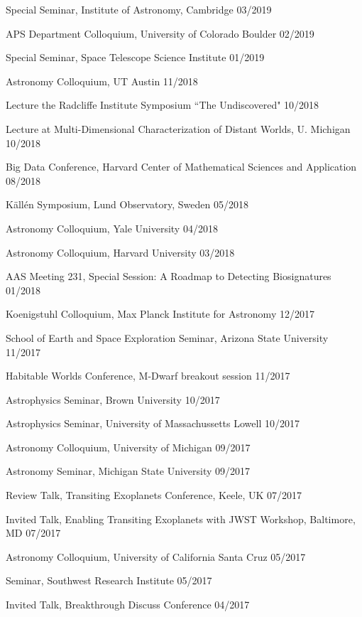 \documentclass[12pt,letterpaper]{article}
\begin{document}
\begin{list}{}{\cvlist}
\item {Special Seminar, Institute of Astronomy, Cambridge \hfill 03/2019}
\item {APS Department Colloquium, University of Colorado Boulder \hfill 02/2019}
\item {Special Seminar, Space Telescope Science Institute \hfill 01/2019}
\item {Astronomy Colloquium, UT Austin \hfill 11/2018}
\item {Lecture the Radcliffe Institute Symposium ``The Undiscovered" \hfill 10/2018}
\item {Lecture at Multi-Dimensional Characterization of Distant Worlds, U. Michigan \hfill 10/2018}
\item {Big Data Conference, Harvard Center of Mathematical Sciences and Application \hfill 08/2018}
\item {K\"{a}ll\'{e}n Symposium, Lund Observatory, Sweden \hfill 05/2018}
\item {Astronomy Colloquium, Yale University \hfill 04/2018}
\item{Astronomy Colloquium, Harvard University \hfill 03/2018}
\item {AAS Meeting 231, Special Session: A Roadmap to Detecting Biosignatures \hfill 01/2018}
\item {Koenigstuhl Colloquium, Max Planck Institute for Astronomy \hfill 12/2017}
\item {School of Earth and Space Exploration Seminar, Arizona State University \hfill 11/2017}
\item {Habitable Worlds Conference, M-Dwarf breakout session \hfill 11/2017}
\item {Astrophysics Seminar, Brown University \hfill 10/2017}
\item {Astrophysics Seminar, University of Massachussetts Lowell \hfill 10/2017}
\item {Astronomy Colloquium, University of Michigan \hfill 09/2017}
\item {Astronomy Seminar, Michigan State University \hfill 09/2017}
\item {Review Talk, Transiting Exoplanets Conference, Keele, UK \hfill 07/2017}
\item {Invited Talk, Enabling Transiting Exoplanets with JWST Workshop, Baltimore, MD \hfill 07/2017}
\item {Astronomy Colloquium, University of California Santa Cruz \hfill 05/2017}
\item {Seminar, Southwest Research Institute \hfill 05/2017}
\item {Invited Talk, Breakthrough Discuss Conference \hfill 04/2017}

\end{list}
\end{document}
